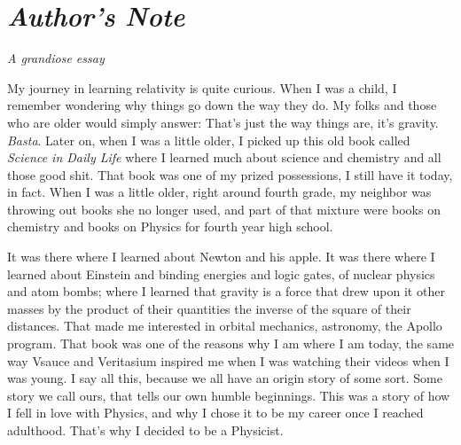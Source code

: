 	
\newpage
	\renewcommand{\refname}{Additional References}
	
		
	\newpage
\section*{ \textit{Author's Note} }
	\textit{A grandiose essay}
	\vspace{0.5cm}

	My journey in learning relativity is quite curious. When I was a child, I remember 
	wondering why things go down the way they do.
	My folks and those who are older would simply answer: That's just the way things are, it's gravity. \textit{Basta}. 
	Later on, when I was a little older, I picked up this old book called \textit{Science in Daily Life} where I learned
	much about science and chemistry and all those good shit. That book was one of my prized possessions,
	I still have it today, in fact. When I was a little older, right around fourth grade, my neighbor
	was throwing out books she no longer used, and part of that mixture were books on chemistry and 
	books on Physics for fourth year high school. 

	It was there where I learned about Newton and his apple. It was there where I learned about Einstein and
	binding energies and logic gates, of nuclear physics and atom bombs; where I learned that gravity is a force that drew upon it other 
	masses by the product of their quantities the inverse of the square of their distances. That made me interested in orbital mechanics,
	astronomy, the Apollo program. That book was one of the reasons why I am where I am today, the same way
	Vsauce and Veritasium inspired me when I was watching their videos when I was young. I say 
	all this, because we all have an origin story of some sort. Some story we call ours, that tells 
	our own humble beginnings. This was a story of how I fell in love with Physics, and why I chose it
	to be my career once I reached adulthood. That's why I decided to be a Physicist.

